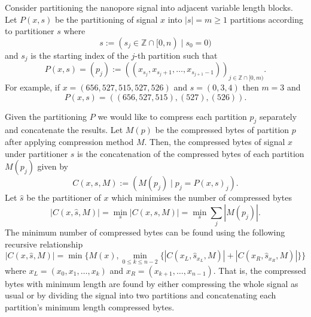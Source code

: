 
Consider partitioning the nanopore signal into adjacent variable length blocks.
Let $P(x,s)$ be the partitioning of signal $x$ into $|s|=m\ge 1$ partitions according to partitioner $s$ where
\[ s := (s_j \in \mathbb{Z}\cap [0, n) \mid s_0 = 0)\]
and $s_j$ is the starting index of the $j$-th partition such that
\[ P(x,s) = (p_j) := ((x_{s_j},x_{s_j+1},\dots,x_{s_{j+1}-1}))_{j\in\mathbb{Z}\cap[0,m)}.\]
For example, if $x=(656,527,515,527,526)$ and $s = (0,3,4)$ then $m=3$ and
\[P(x,s)=((656,527,515),(527),(526)).\]

Given the partitioning $P$ we would like to compress each partition $p_j$ separately and concatenate the results.
Let $M(p)$ be the compressed bytes of partition $p$ after applying compression method $M$.
Then, the compressed bytes of signal $x$ under partitioner $s$ is the concatenation of the compressed bytes of each partition $M(p_j)$ given by
\[ C(x,s,M) := (M(p_j)\mid p_j=P(x,s)_j). \]
Let $\hat s$ be the partitioner of $x$ which minimises the number of compressed bytes
\[ |C(x,\hat s,M)| = \min_s |C(x,s,M)| = \min_s \sum_j|M(p_j)|. \]
The minimum number of compressed bytes can be found using the following recursive relationship
\[ |C(x,\hat s,M)| = \min\{M(x),\min_{0\le k\le n-2}\{|C(x_L,\hat s_{x_L},M)| + |C(x_R,\hat s_{x_R},M)|\}\} \]
where $x_L=(x_0,x_1,\dots,x_k)$ and $x_R=(x_{k+1},\dots,x_{n-1})$.
That is, the compressed bytes with minimum length are found by either compressing the whole signal as usual or by dividing the signal into two partitions and concatenating each partition's minimum length compressed bytes.

